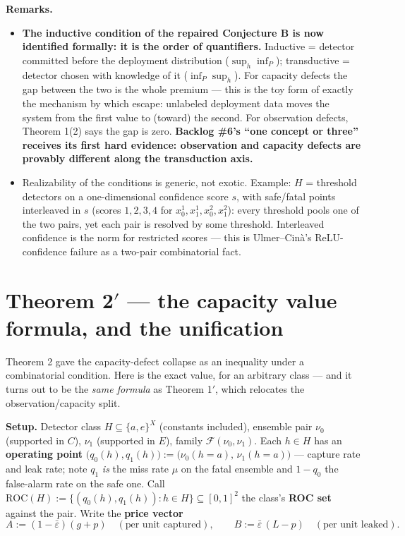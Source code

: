 \documentclass[11pt]{article}
\theoremstyle{plain}
\theoremstyle{definition}
\newcommand{\prm}{\texorpdfstring{$'$}{'}}
\begin{document}
\textbf{Remarks.}
\begin{itemize}
\item \textbf{The inductive condition of the repaired Conjecture B is now identified
  formally: it is the order of quantifiers.} Inductive = detector committed
  before the deployment distribution ($\sup_h \inf_P$); transductive =
  detector chosen with knowledge of it ($\inf_P \sup_h$). For capacity
  defects the gap between the two is the whole premium --- this is the toy form
  of exactly the mechanism by which \citet{goldwasser2020}
  escape: unlabeled deployment data moves the system from the first value to
  (toward) the second. For observation defects, Theorem 1(2) says the gap is
  zero. \textbf{Backlog \#6's ``one concept or three'' receives its first hard
  evidence: observation and capacity defects are provably different along the
  transduction axis.}
\item Realizability of the conditions is generic, not exotic. Example: $H$ =
  threshold detectors on a one-dimensional confidence score $s$, with
  safe/fatal points interleaved in $s$ (scores $1, 2, 3, 4$ for
  $x_0^1, x_1^1, x_0^2, x_1^2$): every threshold pools one of the two pairs,
  yet each pair is resolved by some threshold. Interleaved confidence is the
  norm for restricted scores --- this is Ulmer--Cin\`a's ReLU-confidence failure
  \citep{ulmer2021} as a two-pair combinatorial fact.
\end{itemize}

\section{Theorem 2\prm{} --- the capacity value formula, and the unification}\label{app:thm2prime}

Theorem 2 gave the capacity-defect collapse as an inequality under a
combinatorial condition. Here is the exact value, for an arbitrary class --- and
it turns out to be the \emph{same formula} as Theorem 1$'$, which relocates the
observation/capacity split.

\textbf{Setup.} Detector class $H \subseteq \{a,e\}^X$ (constants included),
ensemble pair $\nu_0$ (supported in $C$), $\nu_1$ (supported in $E$), family
$\mathcal{F}(\nu_0,\nu_1)$. Each $h \in H$ has an \textbf{operating point}
$\big(q_0(h), q_1(h)\big) := \big(\nu_0(h{=}a),\, \nu_1(h{=}a)\big)$ ---
capture rate and leak rate; note $q_1$ \emph{is} the miss rate $\mu$ on the fatal
ensemble and $1 - q_0$ the false-alarm rate on the safe one. Call
$\mathrm{ROC}(H) := \{(q_0(h), q_1(h)) : h \in H\} \subseteq [0,1]^2$ the
class's \textbf{ROC set} against the pair. Write the \textbf{price vector}
$$A := (1-\bar\varepsilon)(g+p) \quad (\text{per unit captured}), \qquad B := \bar\varepsilon\,(L-p) \quad (\text{per unit leaked}).$$
\end{document}
